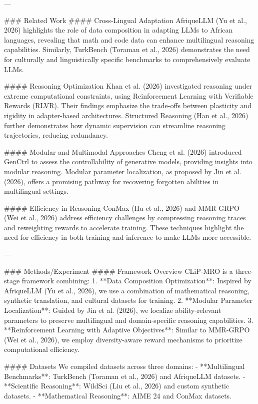 ---

### Related Work
#### Cross-Lingual Adaptation
AfriqueLLM (Yu et al., 2026) highlights the role of data composition in adapting LLMs to African languages, revealing that math and code data can enhance multilingual reasoning capabilities. Similarly, TurkBench (Toraman et al., 2026) demonstrates the need for culturally and linguistically specific benchmarks to comprehensively evaluate LLMs.

#### Reasoning Optimization
Khan et al. (2026) investigated reasoning under extreme computational constraints, using Reinforcement Learning with Verifiable Rewards (RLVR). Their findings emphasize the trade-offs between plasticity and rigidity in adapter-based architectures. Structured Reasoning (Han et al., 2026) further demonstrates how dynamic supervision can streamline reasoning trajectories, reducing redundancy.

#### Modular and Multimodal Approaches
Cheng et al. (2026) introduced GenCtrl to assess the controllability of generative models, providing insights into modular reasoning. Modular parameter localization, as proposed by Jin et al. (2026), offers a promising pathway for recovering forgotten abilities in multilingual settings.

#### Efficiency in Reasoning
ConMax (Hu et al., 2026) and MMR-GRPO (Wei et al., 2026) address efficiency challenges by compressing reasoning traces and reweighting rewards to accelerate training. These techniques highlight the need for efficiency in both training and inference to make LLMs more accessible.

---

### Methods/Experiment
#### Framework Overview
CLiP-MRO is a three-stage framework combining:
1. **Data Composition Optimization**: Inspired by AfriqueLLM (Yu et al., 2026), we use a combination of mathematical reasoning, synthetic translation, and cultural datasets for training.
2. **Modular Parameter Localization**: Guided by Jin et al. (2026), we localize ability-relevant parameters to preserve multilingual and domain-specific reasoning capabilities.
3. **Reinforcement Learning with Adaptive Objectives**: Similar to MMR-GRPO (Wei et al., 2026), we employ diversity-aware reward mechanisms to prioritize computational efficiency.

#### Datasets
We compiled datasets across three domains:
- **Multilingual Benchmarks**: TurkBench (Toraman et al., 2026) and AfriqueLLM datasets.
- **Scientific Reasoning**: WildSci (Liu et al., 2026) and custom synthetic datasets.
- **Mathematical Reasoning**: AIME 24 and ConMax datasets.

